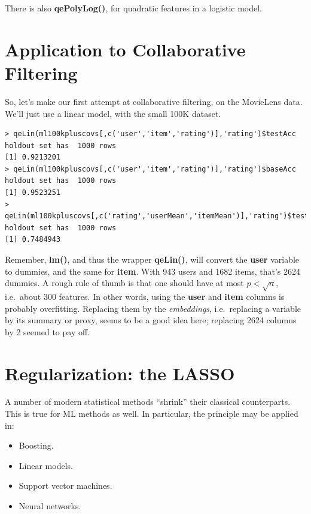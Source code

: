 There is also \textbf{qePolyLog()}, for quadratic features in a logistic
model.

\section{Application to Collaborative Filtering}

So, let's make our first attempt at collaborative filtering, on the
MovieLens data.  We'll just use a linear model, with the small 100K
dataset.

\begin{lstlisting}
> qeLin(ml100kpluscovs[,c('user','item','rating')],'rating')$testAcc
holdout set has  1000 rows
[1] 0.9213201
> qeLin(ml100kpluscovs[,c('user','item','rating')],'rating')$baseAcc
holdout set has  1000 rows
[1] 0.9523251
> qeLin(ml100kpluscovs[,c('rating','userMean','itemMean')],'rating')$testAcc
holdout set has  1000 rows
[1] 0.7484943
\end{lstlisting}

Remember, \textbf{lm()}, and thus the wrapper \textbf{qeLin()}, will
convert the \textbf{user} variable to dummies, and the same for
\textbf{item}.  With 943 users and 1682 items, that's 2624 dummies.
A rough rule of thumb is that one should have at most $p < \sqrt{n}$, i.e.\
about 300 features.  In other words, using the \textbf{user} and
\textbf{item} columns is probably overfitting.  Replacing them by the
\textit{embeddings}, i.e.\ replacing a variable by its summary or proxy,
seems to be a good idea here; replacing 2624 columns by 2 seemed to pay
off.

\section{Regularization: the LASSO}

A number of modern statistical methods ``shrink'' their classical
counterparts.  This is true for ML methods as well.  In particular, the
principle may be applied in:

\begin{itemize}

\item Boosting.

\item Linear models.

\item Support vector machines.

\item Neural networks.

\end{itemize}


